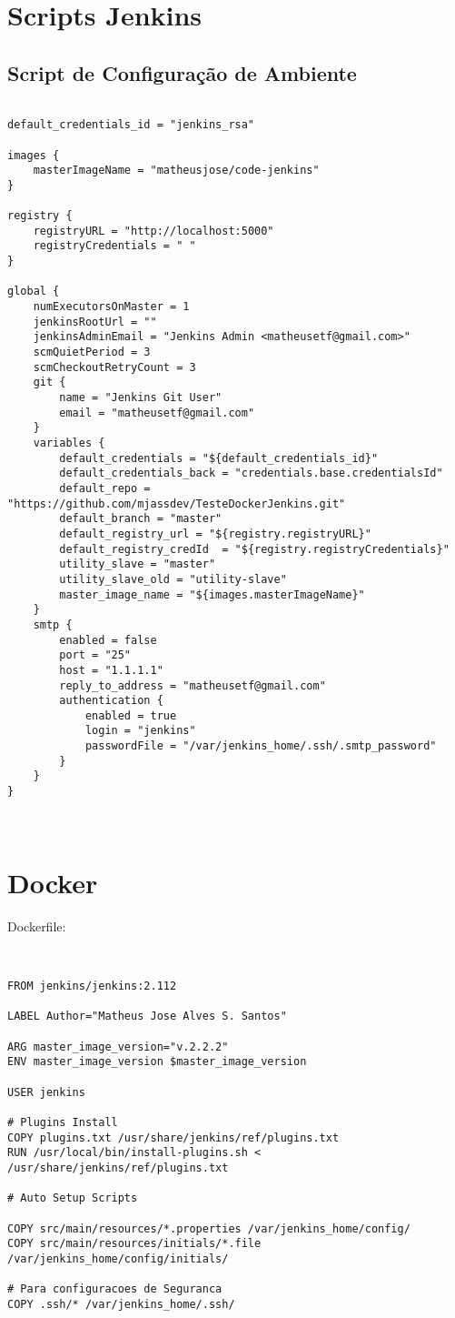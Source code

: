 \section{Scripts Jenkins}

\subsection{Script de Configuração de Ambiente}

\begin{lstlisting}

default_credentials_id = "jenkins_rsa"

images {
	masterImageName = "matheusjose/code-jenkins"
}

registry {
	registryURL = "http://localhost:5000"
	registryCredentials = " "
}

global {
	numExecutorsOnMaster = 1
	jenkinsRootUrl = ""
	jenkinsAdminEmail = "Jenkins Admin <matheusetf@gmail.com>"
	scmQuietPeriod = 3
	scmCheckoutRetryCount = 3
	git {
		name = "Jenkins Git User"
		email = "matheusetf@gmail.com"
	}
	variables {
		default_credentials = "${default_credentials_id}"
		default_credentials_back = "credentials.base.credentialsId"
		default_repo = "https://github.com/mjassdev/TesteDockerJenkins.git"
		default_branch = "master"
		default_registry_url = "${registry.registryURL}"
		default_registry_credId  = "${registry.registryCredentials}"
		utility_slave = "master"
		utility_slave_old = "utility-slave"
		master_image_name = "${images.masterImageName}"
	}
	smtp {
		enabled = false
		port = "25"
		host = "1.1.1.1"
		reply_to_address = "matheusetf@gmail.com"
		authentication {
			enabled = true
			login = "jenkins"
			passwordFile = "/var/jenkins_home/.ssh/.smtp_password"
		}	
	}
}



\end{lstlisting}

\section{Docker}

\noindent
Dockerfile:

\begin{lstlisting}


FROM jenkins/jenkins:2.112

LABEL Author="Matheus Jose Alves S. Santos"

ARG master_image_version="v.2.2.2"
ENV master_image_version $master_image_version

USER jenkins

# Plugins Install
COPY plugins.txt /usr/share/jenkins/ref/plugins.txt
RUN /usr/local/bin/install-plugins.sh < /usr/share/jenkins/ref/plugins.txt

# Auto Setup Scripts

COPY src/main/resources/*.properties /var/jenkins_home/config/
COPY src/main/resources/initials/*.file /var/jenkins_home/config/initials/

# Para configuracoes de Seguranca
COPY .ssh/* /var/jenkins_home/.ssh/
\end{lstlisting}


